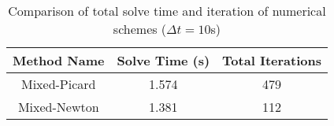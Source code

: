 \begin{table}[!ht]
\centering
\caption{Comparison of total solve time and iteration of numerical schemes ($\Delta t = 10$s)}
\begin{tabular}{*{3}{c}}
\hline
Method Name &  Solve Time (s) &    Total Iterations  \\
\hline
Mixed-Picard   &     1.574    &                 479  \\
Mixed-Newton   &     1.381    &                 112  \\
\hline
\end{tabular}
\label{table:richards-iterations}
\end{table}
